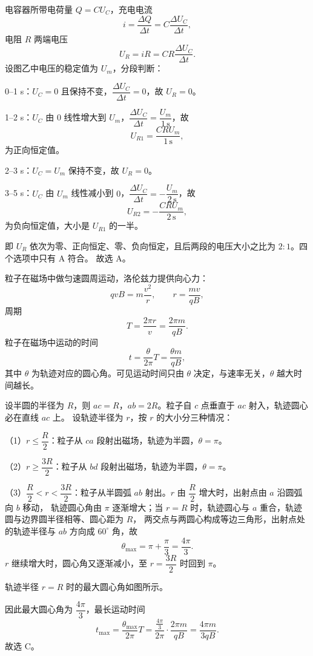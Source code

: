 \begin{answer}
电容器所带电荷量 $Q=CU_C$，充电电流
\[
  i=\frac{\Delta Q}{\Delta t}=C\frac{\Delta U_C}{\Delta t},
\]
电阻 $R$ 两端电压
\[
  U_R=iR=CR\frac{\Delta U_C}{\Delta t}.
\]
设图乙中电压的稳定值为 $U_m$，分段判断：

0--1 s：$U_C=0$ 且保持不变，$\dfrac{\Delta U_C}{\Delta t}=0$，故 $U_R=0$。

1--2 s：$U_C$ 由 $0$ 线性增大到 $U_m$，$\dfrac{\Delta U_C}{\Delta t}=\dfrac{U_m}{1\,\mathrm{s}}$，故
\[
  U_{R1}=\frac{CRU_m}{1\,\mathrm{s}},
\]
为正向恒定值。

2--3 s：$U_C=U_m$ 保持不变，故 $U_R=0$。

3--5 s：$U_C$ 由 $U_m$ 线性减小到 $0$，$\dfrac{\Delta U_C}{\Delta t}=-\dfrac{U_m}{2\,\mathrm{s}}$，故
\[
  U_{R2}=-\frac{CRU_m}{2\,\mathrm{s}},
\]
为负向恒定值，大小是 $U_{R1}$ 的一半。

即 $U_R$ 依次为零、正向恒定、零、负向恒定，且后两段的电压大小之比为 $2:1$。四个选项中只有 A 符合。
故选 A。
\end{answer}

\begin{answer}
粒子在磁场中做匀速圆周运动，洛伦兹力提供向心力：
\[
  qvB=m\frac{v^{2}}{r},\qquad r=\frac{mv}{qB},
\]
周期
\[
  T=\frac{2\pi r}{v}=\frac{2\pi m}{qB}.
\]
粒子在磁场中运动的时间
\[
  t=\frac{\theta}{2\pi}T=\frac{\theta m}{qB},
\]
其中 $\theta$ 为轨迹对应的圆心角。可见运动时间只由 $\theta$ 决定，与速率无关，$\theta$ 越大时间越长。

设半圆的半径为 $R$，则 $ac=R$，$ab=2R$。粒子自 $c$ 点垂直于 $ac$ 射入，轨迹圆心必在直线 $ac$ 上。
设轨迹半径为 $r$，按 $r$ 的大小分三种情况：

（1）$r\le \dfrac{R}{2}$：粒子从 $ca$ 段射出磁场，轨迹为半圆，$\theta=\pi$。

（2）$r\ge \dfrac{3R}{2}$：粒子从 $bd$ 段射出磁场，轨迹为半圆，$\theta=\pi$。

（3）$\dfrac{R}{2}<r<\dfrac{3R}{2}$：粒子从半圆弧 $ab$ 射出。$r$ 由 $\dfrac{R}{2}$ 增大时，出射点由 $a$ 沿圆弧向 $b$ 移动，
轨迹圆心角由 $\pi$ 逐渐增大；当 $r=R$ 时，轨迹圆心与 $a$ 重合，轨迹圆与边界圆半径相等、圆心距为 $R$，
两交点与两圆心构成等边三角形，出射点处的轨迹半径与 $ab$ 方向成 $60^{\circ}$ 角，故
\[
  \theta_{\max}=\pi+\frac{\pi}{3}=\frac{4\pi}{3}.
\]
$r$ 继续增大时，圆心角又逐渐减小，至 $r=\dfrac{3R}{2}$ 时回到 $\pi$。

\begin{center}
  \small 轨迹半径 $r=R$ 时的最大圆心角如图所示。
\end{center}

因此最大圆心角为 $\dfrac{4\pi}{3}$，最长运动时间
\[
  t_{\max}=\frac{\theta_{\max}}{2\pi}T
         =\frac{\frac{4\pi}{3}}{2\pi}\cdot\frac{2\pi m}{qB}
         =\frac{4\pi m}{3qB}.
\]
故选 C。
\end{answer}

